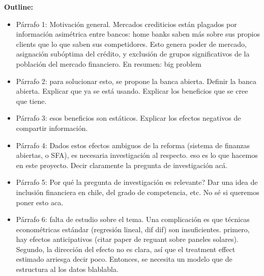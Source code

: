 \documentclass[11pt]{article}
\theoremstyle{plain}
\theoremstyle{plain}
\begin{document}
\newpage

\noindent \textbf{Outline:}
\begin{itemize}
    \item Párrafo 1: Motivación general. Mercados crediticios están plagados por información asimétrica entre bancos: home banks saben más sobre sus propios clients que lo que saben sus competidores. Esto genera poder de mercado, asignación subóptima del crédito, y exclusión de grupos significativos de la población del mercado financiero. En resumen: big problem


\item Párrafo 2: para solucionar esto, se propone la banca abierta. Definir la banca abierta. Explicar que ya se está usando. Explicar los beneficios que se cree que tiene.

    \item Párrafo 3: esos beneficios son estáticos. Explicar los efectos negativos de compartir información. 

    \item Párrafo 4: Dados estos efectos ambiguos de la reforma (sistema de finanzas abiertas, o SFA), es necesaria investigación al respecto. eso es lo que hacemos en este proyecto. Decir claramente la pregunta de investigación acá.

    \item Párrafo 5: Por qué la pregunta de investigación es relevante? Dar una idea de inclusión financiera en chile, del grado de competencia, etc. No sé si queremos poner esto aca. 

    \item Párrafo 6: falta de estudio sobre el tema. Una complicación es que técnicas econométricas estándar (regresión lineal, dif dif) son insuficientes. primero, hay efectos anticipativos (citar paper de reguant sobre paneles solares). Segundo, la dirección del efecto no es clara, así que el treatment effect estimado arriesga decir poco. Entonces, se necesita un modelo que de estructura al los datos blablabla.


\end{itemize}
\end{document}
